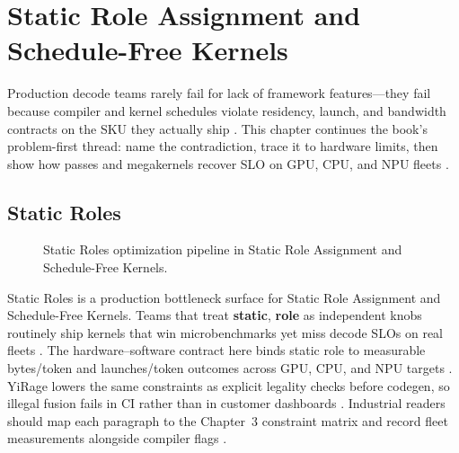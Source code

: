 \chapter{Static Role Assignment and Schedule-Free Kernels}
\label{chap:ch07}

Production decode teams rarely fail for lack of framework features---they fail because compiler and kernel schedules violate residency, launch, and bandwidth contracts on the SKU they actually ship \citep{patel2025llminference,nvidia2022hopper}. This chapter continues the book's problem-first thread: name the contradiction, trace it to hardware limits, then show how passes and megakernels recover SLO on GPU, CPU, and NPU fleets \citep{taxbreak2026,semianalysis2024tma}.

\section{Static Roles}
\label{sec:static_roles}
\begin{figure}[t]
\centering
{}
\caption{Static Roles optimization pipeline in Static Role Assignment and Schedule-Free Kernels.}
\label{fig:static_roles_pipeline}
\end{figure}


Static Roles is a production bottleneck surface for Static Role Assignment and Schedule-Free Kernels. Teams that treat \textbf{static}, \textbf{role} as independent knobs routinely ship kernels that win microbenchmarks yet miss decode SLOs on real fleets \citep{patel2025llminference,nvidia2022hopper}. The hardware--software contract here binds static role to measurable bytes/token and launches/token outcomes across GPU, CPU, and NPU targets \citep{taxbreak2026,semianalysis2024tma}. YiRage lowers the same constraints as explicit legality checks before codegen, so illegal fusion fails in CI rather than in customer dashboards \citep{memoryfloor2026,amd2024xdna}. Industrial readers should map each paragraph to the Chapter~3 constraint matrix and record fleet measurements alongside compiler flags \citep{nvidia2022hopper,amd2024aie}.

